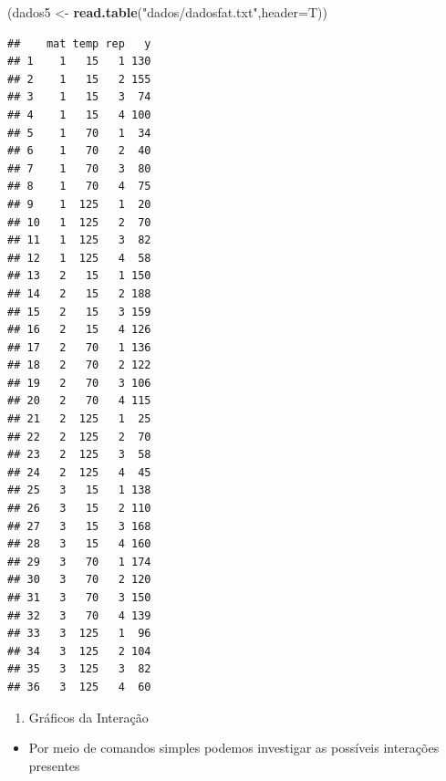 \documentclass[
]{book}
\newenvironment{Shaded}{\begin{snugshade}}{\end{snugshade}}
\newcommand{\AttributeTok}[1]{\textcolor[rgb]{0.13,0.29,0.53}{#1}}
\newcommand{\CommentTok}[1]{\textcolor[rgb]{0.56,0.35,0.01}{\textit{#1}}}
\newcommand{\FunctionTok}[1]{\textcolor[rgb]{0.13,0.29,0.53}{\textbf{#1}}}
\newcommand{\NormalTok}[1]{#1}
\newcommand{\OtherTok}[1]{\textcolor[rgb]{0.56,0.35,0.01}{#1}}
\newcommand{\SpecialCharTok}[1]{\textcolor[rgb]{0.81,0.36,0.00}{\textbf{#1}}}
\newcommand{\StringTok}[1]{\textcolor[rgb]{0.31,0.60,0.02}{#1}}
\providecommand{\tightlist}{%
  \setlength{\itemsep}{0pt}\setlength{\parskip}{0pt}}
\begin{document}
\begin{Shaded}
\begin{Highlighting}[]
\NormalTok{(dados5 }\OtherTok{\textless{}{-}} \FunctionTok{read.table}\NormalTok{(}\StringTok{"dados/dadosfat.txt"}\NormalTok{,}\AttributeTok{header=}\NormalTok{T))}
\end{Highlighting}
\end{Shaded}

\begin{verbatim}
##    mat temp rep   y
## 1    1   15   1 130
## 2    1   15   2 155
## 3    1   15   3  74
## 4    1   15   4 100
## 5    1   70   1  34
## 6    1   70   2  40
## 7    1   70   3  80
## 8    1   70   4  75
## 9    1  125   1  20
## 10   1  125   2  70
## 11   1  125   3  82
## 12   1  125   4  58
## 13   2   15   1 150
## 14   2   15   2 188
## 15   2   15   3 159
## 16   2   15   4 126
## 17   2   70   1 136
## 18   2   70   2 122
## 19   2   70   3 106
## 20   2   70   4 115
## 21   2  125   1  25
## 22   2  125   2  70
## 23   2  125   3  58
## 24   2  125   4  45
## 25   3   15   1 138
## 26   3   15   2 110
## 27   3   15   3 168
## 28   3   15   4 160
## 29   3   70   1 174
## 30   3   70   2 120
## 31   3   70   3 150
## 32   3   70   4 139
## 33   3  125   1  96
## 34   3  125   2 104
## 35   3  125   3  82
## 36   3  125   4  60
\end{verbatim}

\begin{enumerate}
\def\labelenumi{\arabic{enumi}.}
\setcounter{enumi}{1}
\tightlist
\item
  Gráficos da Interação
\end{enumerate}

\begin{itemize}
\tightlist
\item
  Por meio de comandos simples podemos investigar as possíveis interações presentes
\end{itemize}

\begin{Shaded}
\end{Shaded}
\end{document}
